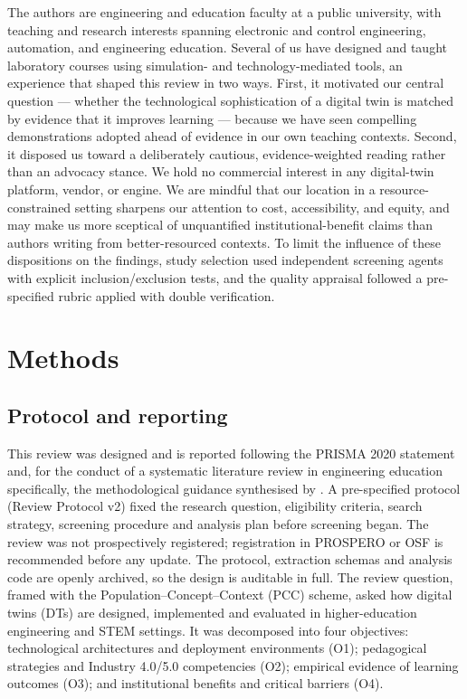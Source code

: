 The authors are engineering and education faculty at a public university, with
teaching and research interests spanning electronic and control engineering,
automation, and engineering education. Several of us have designed and taught
laboratory courses using simulation- and technology-mediated tools, an
experience that shaped this review in two ways. First, it motivated our central
question --- whether the technological sophistication of a digital twin is matched
by evidence that it improves learning --- because we have seen compelling
demonstrations adopted ahead of evidence in our own teaching contexts. Second, it
disposed us toward a deliberately cautious, evidence-weighted reading rather than
an advocacy stance. We hold no commercial interest in any digital-twin platform,
vendor, or engine. We are mindful that our location in a resource-constrained
setting sharpens our attention to cost, accessibility, and equity, and may make
us more sceptical of unquantified institutional-benefit claims than authors
writing from better-resourced contexts. To limit the influence of these
dispositions on the findings, study selection used independent screening agents
with explicit inclusion/exclusion tests, and the quality appraisal followed a
pre-specified rubric applied with double verification.

\section{Methods}\label{methods}

\subsection{Protocol and reporting}\label{protocol-and-reporting}

This review was designed and is reported following the PRISMA 2020 statement and,
for the conduct of a systematic literature review in engineering education
specifically, the methodological guidance synthesised by \citet{borrego_systematic_2014}.
A pre-specified protocol (Review Protocol v2) fixed the research question,
eligibility criteria, search strategy, screening procedure and analysis plan
before screening began. The review was not prospectively registered; registration
in PROSPERO or OSF is recommended before any update. The protocol, extraction
schemas and analysis code are openly archived, so the design is auditable in full. The review question, framed with the
Population--Concept--Context (PCC) scheme, asked how digital twins (DTs) are
designed, implemented and evaluated in higher-education engineering and STEM
settings. It was decomposed into four objectives: technological architectures and
deployment environments (O1); pedagogical strategies and Industry 4.0/5.0
competencies (O2); empirical evidence of learning outcomes (O3); and institutional
benefits and critical barriers (O4).

